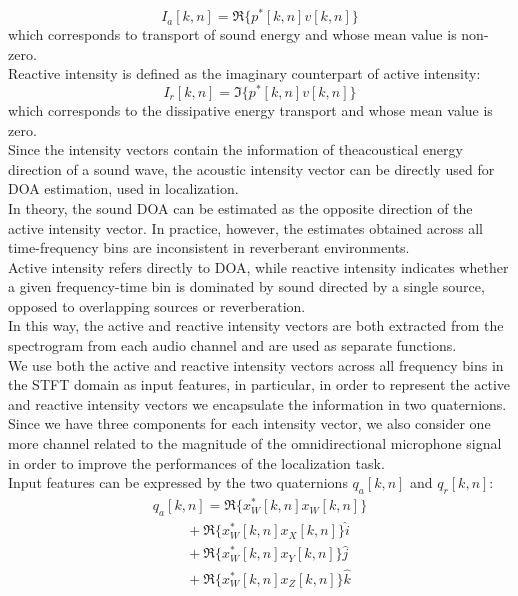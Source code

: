 \documentclass{article}
\begin{document}
    \begin{equation*}
        I_a [k,n]= \Re\{ p^*[k,n]v[k,n]\} 
    \end{equation*}
    which corresponds to transport of sound energy and whose mean value is non-zero.
    \\ Reactive intensity is defined as the imaginary counterpart of active intensity:
    \begin{equation*}
        I_r [k,n]= \Im \{ p^*[k,n]v[k,n]\} 
    \end{equation*}
    which corresponds to the dissipative energy transport and whose mean value is zero.
    \\ Since the intensity vectors contain the information of theacoustical energy direction of a sound wave, the acoustic intensity
    vector can be directly used for DOA estimation, used in localization.
    \\ In theory, the sound DOA can be estimated as the opposite direction of the active intensity vector. In practice, however, 
    the estimates obtained across all time-frequency bins are inconsistent in reverberant environments.
    \\ Active intensity refers directly to DOA, while reactive intensity indicates whether a given frequency-time bin is dominated
    by sound directed by a single source, opposed to overlapping sources or reverberation. 
    \\ In this way, the active and reactive intensity vectors are both extracted from the spectrogram from each audio channel and 
    are used as separate functions.
    \\ We use both the active and reactive intensity vectors across all frequency bins in the STFT domain as input features,
    in particular,  in order to represent the active and reactive intensity vectors we encapsulate the information in two quaternions. 
    \\  Since we have three components for each intensity vector, we also consider one more channel related to the magnitude of the
    omnidirectional microphone signal in order to improve the performances of the localization task.
    \\ Input features can be expressed by the two quaternions $q_a[k,n]$ and $q_r[k,n]$:
    \begin{equation*}
            \begin{matrix}
                q_a[k,n]=\Re\{x_W^*[k,n]x_W[k,n]\} \\
                \hspace{1cm} + \Re\{x_W^*[k,n]x_X[k,n]\}\hat{i} \\
                \hspace{1cm} + \Re\{x_W^*[k,n]x_Y[k,n]\}\hat{j} \\
                \hspace{1cm} + \Re\{x_W^*[k,n]x_Z[k,n]\}\hat{k} \\
            \end{matrix}
    \end{equation*}
\end{document}
